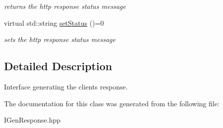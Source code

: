 \begin{DoxyCompactItemize}
\begin{DoxyCompactList}\small\item\em returns the http response status message \end{DoxyCompactList}\item 
\hypertarget{class_i_gen_response_a8c19372e819c4e386ac066eaa172988b}{}virtual std\+::string \hyperlink{class_i_gen_response_a8c19372e819c4e386ac066eaa172988b}{set\+Status} ()=0\label{class_i_gen_response_a8c19372e819c4e386ac066eaa172988b}

\begin{DoxyCompactList}\small\item\em sets the http response status message \end{DoxyCompactList}\end{DoxyCompactItemize}


\subsection{Detailed Description}
Interface generating the client\textquotesingle{}s response. 

The documentation for this class was generated from the following file\+:\begin{DoxyCompactItemize}
\item 
I\+Gen\+Response.\+hpp\end{DoxyCompactItemize}
